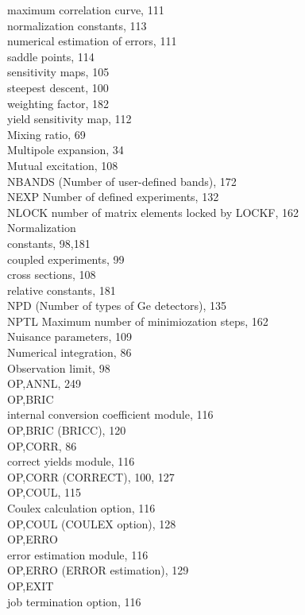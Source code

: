 \documentclass[10pt]{article}
\begin{document}
maximum correlation curve, 111\\
normalization constants, 113\\
numerical estimation of errors, 111\\
saddle points, 114\\
sensitivity maps, 105\\
steepest descent, 100\\
weighting factor, 182\\
yield sensitivity map, 112\\
Mixing ratio, 69\\
Multipole expansion, 34\\
Mutual excitation, 108\\
NBANDS (Number of user-defined bands), 172\\
NEXP Number of defined experiments, 132\\
NLOCK number of matrix elements locked by LOCKF, 162\\
Normalization\\
constants, 98,181\\
coupled experiments, 99\\
cross sections, 108\\
relative constants, 181\\
NPD (Number of types of Ge detectors), 135\\
NPTL Maximum number of minimiozation steps, 162\\
Nuisance parameters, 109\\
Numerical integration, 86\\
Observation limit, 98\\
OP,ANNL, 249\\
OP,BRIC\\
internal conversion coefficient module, 116\\
OP,BRIC (BRICC), 120\\
OP,CORR, 86\\
correct yields module, 116\\
OP,CORR (CORRECT), 100, 127\\
OP,COUL, 115\\
Coulex calculation option, 116\\
OP,COUL (COULEX option), 128\\
OP,ERRO\\
error estimation module, 116\\
OP,ERRO (ERROR estimation), 129\\
OP,EXIT\\
job termination option, 116\\
\end{document}
